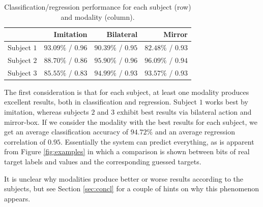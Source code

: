 \begin{table}[!ht] \centering
  \caption{Classification/regression performance for each subject
    (row) and modality (column).}
  \begin{tabular}{|c|r|r|r|}
    \hline
                & Imitation & Bilateral & Mirror \\
    \hline
    Subject $1$ & $93.09\%$ / $0.96$ & $90.39\%$ / $0.95$ & $82.48\%$ / $0.93$ \\
    Subject $2$ & $88.70\%$ / $0.86$ & $95.90\%$ / $0.96$ & $96.09\%$ / $0.94$ \\
    Subject $3$ & $85.55\%$ / $0.83$ & $94.99\%$ / $0.93$ & $93.57\%$ / $0.93$ \\
    \hline
  \end{tabular}
  \label{tab:results}
\end{table}

The first consideration is that for each subject, at least one
modality produces excellent results, both in classification and
regression. Subject $1$ works best by imitation, whereas subjects $2$
and $3$ exhibit best results via bilateral action and mirror-box. If
we consider the modality with the best results for each subject, we
get an average classification accuracy of $94.72\%$ and an average
regression correlation of $0.95$. Essentially the system can predict
everything, as is apparent from Figure \ref{fig:examples} in which a
comparison is shown between bits of real target labels and values and
the corresponding guessed targets.

It is unclear why modalities produce better or worse results according
to the subjects, but see Section \ref{sec:concl} for a couple of hints
on why this phenomenon appears.

